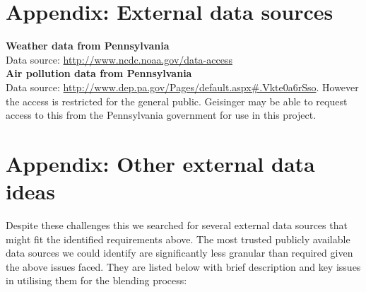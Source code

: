 \documentclass{article}
\begin{document}
\section*{Appendix: External data sources}


{\bf Weather data from Pennsylvania}\\
Data source: \url{http://www.ncdc.noaa.gov/data-access}\\

{\bf Air pollution data from Pennsylvania}\\
Data source: \url{http://www.dep.pa.gov/Pages/default.aspx#.Vkte0a6rSso}. However the access is restricted for the general public. Geisinger may be able to request access to this from the Pennsylvania government for use in this project.

\section*{Appendix: Other external data ideas}

Despite these challenges this we searched for several external data sources that might fit the identified requirements above. The most trusted publicly available data sources we could identify are 
significantly less granular than required given the above issues faced. They are 
listed below with brief description and key issues in utilising them 
for the blending process:
\end{document}

